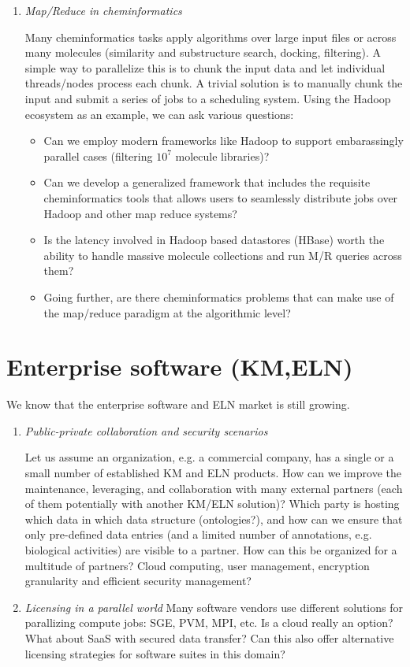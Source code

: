 \documentclass{sig-alternate}
\begin{document}
\begin{enumerate}
\item \emph{Map/Reduce in cheminformatics}

  Many cheminformatics tasks apply algorithms over large input files
  or across many molecules (similarity and substructure search,
  docking, filtering). A simple way to parallelize this is to chunk
  the input data and let individual threads/nodes process each chunk. A
  trivial solution is to manually chunk the input and submit a series
  of jobs to a scheduling system. Using the Hadoop ecosystem as an
  example, we can ask various questions:
  \begin{itemize}
  \item Can we employ modern frameworks like Hadoop to support
    embarassingly parallel cases (filtering $10^7$ molecule libraries)?
  \item Can we develop a generalized framework that includes the
    requisite cheminformatics tools that allows users to seamlessly
    distribute jobs over Hadoop and other map reduce systems?
  \item Is the latency involved in Hadoop based datastores (HBase)
    worth the ability to handle massive molecule collections and run
    M/R queries across them? 
  \item Going further, are there cheminformatics problems that can make use
  of the map/reduce paradigm at the algorithmic level?
  \end{itemize}
\end{enumerate}

\section*{Enterprise software (KM,ELN)}
We know that the enterprise software and ELN market is still growing.
\begin{enumerate}
\item \emph{Public-private collaboration and security scenarios}

  Let us assume an organization, e.g. a commercial company, has a
  single or a small number of established KM and ELN products.  How
  can we improve the maintenance, leveraging, and collaboration with
  many external partners (each of them potentially with another KM/ELN
  solution)? Which party is hosting which data in which data structure
  (ontologies?), and how can we ensure that only pre-defined data
  entries (and a limited number of annotations, e.g. biological
  activities) are visible to a partner.  How can this be organized for
  a multitude of partners? Cloud computing, user management,
  encryption granularity and efficient security management?

\item \emph{Licensing in a parallel world} Many software vendors use
  different solutions for parallizing compute jobs: SGE, PVM, MPI,
  etc.  Is a cloud really an option?  What about SaaS with secured data
  transfer?  Can this also offer alternative licensing strategies for
  software suites in this domain?


\end{enumerate}



\end{document}
